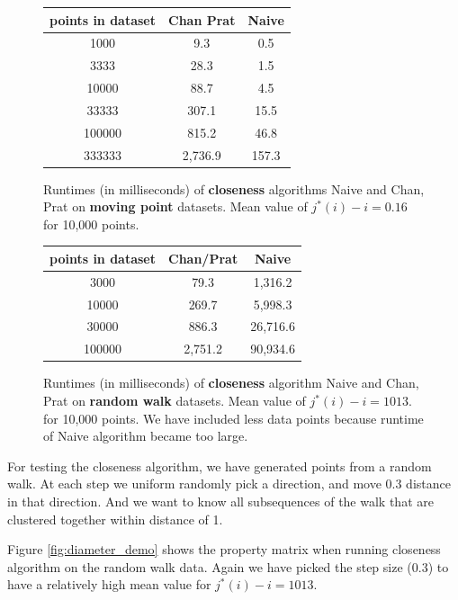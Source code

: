 \documentclass{article}
\begin{document}
\begin{figure}[!ht]
  \centering
\begin{tabular}{c|c|c}
    points in dataset &  Chan Prat    & Naive  \\
\hline
    1000    & 9.3    & 0.5  \\
\hline
    3333    & 28.3    & 1.5  \\
\hline
    10000    & 88.7    & 4.5  \\
\hline
    33333    & 307.1    & 15.5  \\
\hline
    100000    & 815.2    & 46.8  \\
\hline
    333333    & 2,736.9    & 157.3 
\end{tabular}
  \caption{Runtimes (in milliseconds) of \textbf{closeness} algorithms
  Naive and Chan, Prat on \textbf{moving point} datasets. Mean value
  of $j^*(i) - i = 0.16$ for 10,000 points.}
  \label{fig:diameter_comparison_moving_gaussian}
\end{figure}

\begin{figure}[!ht]
  \centering
\begin{tabular}{c|c|c}
    points in dataset &  Chan/Prat    & Naive  \\
\hline
    3000    & 79.3    & 1,316.2  \\
\hline
    10000    & 269.7    & 5,998.3  \\
\hline
    30000    & 886.3    & 26,716.6  \\
\hline
    100000    & 2,751.2    & 90,934.6 
\end{tabular}
  \caption{Runtimes (in milliseconds) of \textbf{closeness} algorithm
  Naive and Chan, Prat on \textbf{random walk} datasets. Mean value
  of $j^*(i) - i = 1013$. for 10,000 points. We have included less
  data points because runtime of Naive algorithm became too large.}
  \label{fig:diameter_comparison_random_walk}
\end{figure}

For testing the closeness algorithm, we have generated points from
a random walk.  At each step we uniform randomly pick a direction,
and move 0.3 distance in that direction. And we want to know all
subsequences of the walk that are clustered together within distance
of 1.

Figure \ref{fig:diameter_demo} shows the property matrix when running
closeness algorithm on the random walk data. Again we have picked
the step size (0.3) to have a relatively high mean value for $j^*(i)
-i = 1013$.
\end{document}
